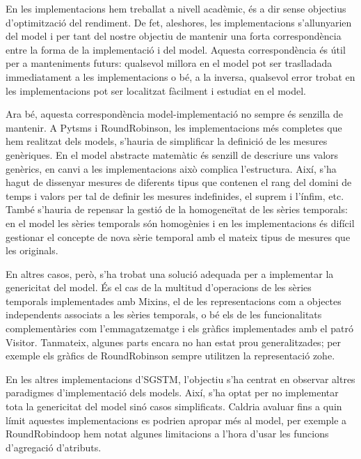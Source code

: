 En les implementacions hem treballat a nivell acadèmic, és a dir sense
objectius d'optimització del rendiment. De fet, aleshores, les
implementacions s'allunyarien del model i per tant del nostre objectiu
de mantenir una forta correspondència entre la forma de la
implementació i del model. Aquesta correspondència és útil per a
manteniments futurs: qualsevol millora en el model pot ser
traslladada immediatament a les implementacions o bé, a la inversa,
qualsevol error trobat en les implementacions pot ser localitzat
fàcilment i estudiat en el model.





Ara bé, aquesta correspondència model-implementació no sempre és
senzilla de mantenir. A Pytsms i RoundRobinson, les implementacions
més completes que hem realitzat dels models, s'hauria de simplificar
la definició de les mesures genèriques.  En el model abstracte
matemàtic és senzill de descriure uns valors genèrics, en canvi a les
implementacions això complica l'estructura. Així, s'ha hagut de
dissenyar mesures de diferents tipus que contenen el rang del domini
de temps i valors per tal de definir les mesures indefinides, el
suprem i l'ínfim, etc.  També s'hauria de repensar la gestió de la
homogeneïtat de les sèries temporals: en el model les sèries temporals
són homogènies i en les implementacions és difícil gestionar el
concepte de nova sèrie temporal amb el mateix tipus de mesures que les
originals.

En altres casos, però, s'ha trobat una solució adequada per a
implementar la genericitat del model.  És el cas de la
multitud d'operacions de les sèries temporals implementades amb
Mixins, el de les representacions com a objectes independents
associats a les sèries temporals, o bé els de les funcionalitats
complementàries com l'emmagatzematge i els gràfics implementades amb
el patró Visitor. Tanmateix, algunes parts encara no han estat prou
generalitzades; per exemple els gràfics de RoundRobinson sempre
utilitzen la representació \gls{zohe}.





En les altres implementacions d'\gls{SGSTM}, l'objectiu s'ha centrat
en observar altres paradigmes d'implementació dels models. Així, s'ha
optat per no implementar tota la genericitat del model sinó casos
simplificats. Caldria avaluar fins a quin límit aquestes
implementacions es podrien apropar més al model, per exemple a
RoundRobindoop hem notat algunes limitacions a l'hora d'usar les
funcions d'agregació d'atributs.


